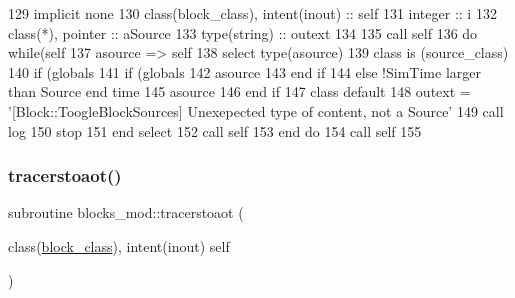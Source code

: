\begin{DoxyCode}
129     \textcolor{keywordtype}{implicit none}
130     \textcolor{keywordtype}{class}(block\_class), \textcolor{keywordtype}{intent(inout)} :: self
131     \textcolor{keywordtype}{integer} :: i
132     \textcolor{keywordtype}{class}(*), \textcolor{keywordtype}{pointer} :: aSource
133     \textcolor{keywordtype}{type}(string) :: outext
134 
135     \textcolor{keyword}{call }self%
136     \textcolor{keywordflow}{do} \textcolor{keywordflow}{while}(self%
137         asource => self%
138         \textcolor{keywordflow}{select type}(asource)
139 \textcolor{keywordflow}{        class is} (source\_class)
140             \textcolor{keywordflow}{if} (globals%
141                 \textcolor{keywordflow}{if} (globals%
142                     asource%
143 \textcolor{keywordflow}{                end if}
144             \textcolor{keywordflow}{else}            \textcolor{comment}{!SimTime larger than Source end time}
145                 asource%
146 \textcolor{keywordflow}{            end if}
147 \textcolor{keywordflow}{            class default}
148             outext = \textcolor{stringliteral}{'[Block::ToogleBlockSources] Unexepected type of content, not a Source'}
149             \textcolor{keyword}{call }log%
150             stop
151 \textcolor{keywordflow}{        end select}
152         \textcolor{keyword}{call }self%
153 \textcolor{keywordflow}{    end do}
154     \textcolor{keyword}{call }self%
155 
\end{DoxyCode}
\mbox{\label{namespaceblocks__mod_ae7afa742f8f89a6a8afdefb7f8c87efd}} 
\subsubsection{\texorpdfstring{tracerstoaot()}{tracerstoaot()}}
{\footnotesize\ttfamily subroutine blocks\+\_\+mod\+::tracerstoaot (\begin{DoxyParamCaption}\item[{class(\mbox{\hyperlink{structblocks__mod_1_1block__class}{block\+\_\+class}}), intent(inout)}]{self }\end{DoxyParamCaption})\hspace{0.3cm}{\ttfamily [private]}}



